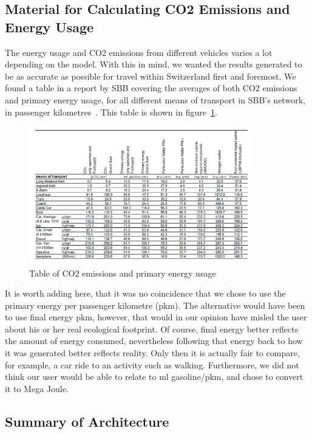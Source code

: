 \documentclass[10pt,conference,compsocconf]{IEEEtran}
\begin{document}
\subsection{Material for Calculating CO2 Emissions and Energy Usage}

The energy usage and CO2 emissions from different vehicles varies a lot depending on the model. With this in mind, we wanted the results generated to be as accurate as possible for travel within Switzerland first and foremost. We found a table in a report by SBB covering the averages of both CO2 emissions and primary energy usage, for all different means of transport in SBB’s network, in passenger kilometres~\cite{sbbcalculator2017}. This table is shown in figure~\ref{fig:sbb-table}.

\begin{figure}[h]
	\centering
	\includegraphics[width=\columnwidth, height=6cm, keepaspectratio]{ressources/sbb-table.png}
	\vspace{0em} %
	\caption{Table of CO2 emissions and primary energy usage~\cite{sbbcalculator2017}}
	\label{fig:sbb-table}
\end{figure}

It is worth adding here, that it was no coincidence that we chose to use the primary energy per passenger kilometre (pkm). The alternative would have been to use final energy pkm, however, that would in our opinion have misled the user about his or her real ecological footprint. Of course, final energy better reflects the amount of energy consumed, nevertheless following that energy back to how it was generated better reflects reality. Only then it is actually fair to compare, for example, a car ride to an activity such as walking. 
Furthermore, we did not think our user would be able to relate to ml gasoline/pkm, and chose to convert it to Mega Joule. 


\subsection{Summary of Architecture}
\end{document}
